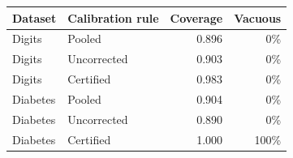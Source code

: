 \begin{tabular}{llrr}
\hline
Dataset & Calibration rule & Coverage & Vacuous \\
\hline
Digits & Pooled & 0.896 & 0\% \\
Digits & Uncorrected & 0.903 & 0\% \\
Digits & Certified & 0.983 & 0\% \\
Diabetes & Pooled & 0.904 & 0\% \\
Diabetes & Uncorrected & 0.890 & 0\% \\
Diabetes & Certified & 1.000 & 100\% \\
\hline\end{tabular}
